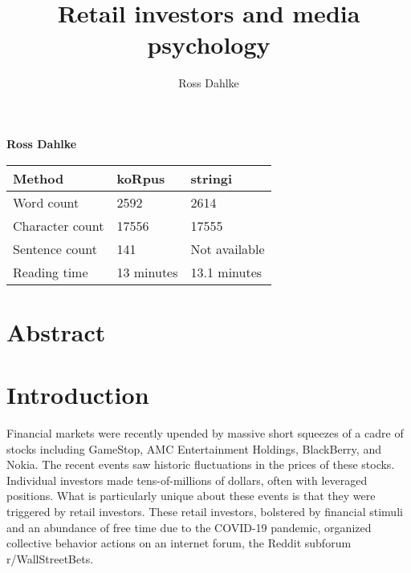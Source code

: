 \documentclass[12pt,]{article}
\title{Retail investors and media psychology  }
\author{\Large Ross Dahlke\vspace{0.05in} \newline\normalsize\emph{}  }
\date{}
\newcommand*{\authorfont}{\fontfamily{phv}\selectfont}
\begin{document}
	
%

{%
\setlength{\parindent}{0pt}
\thispagestyle{plain}
{\fontsize{18}{20}\selectfont\raggedright 
\maketitle  %

}

{
   \vskip 13.5pt\relax \normalsize\fontsize{11}{12} 
\textbf{\authorfont Ross Dahlke} \hskip 15pt \emph{\small }   

}

}






\vskip -8.5pt



\noindent \doublespacing 

\begin{longtable}[]{@{}lll@{}}
\toprule
Method & koRpus & stringi\tabularnewline
\midrule
\endhead
Word count & 2592 & 2614\tabularnewline
Character count & 17556 & 17555\tabularnewline
Sentence count & 141 & Not available\tabularnewline
Reading time & 13 minutes & 13.1 minutes\tabularnewline
\bottomrule
\end{longtable}

\hypertarget{abstract}{%
\section{Abstract}\label{abstract}}

\hypertarget{introduction}{%
\section{Introduction}\label{introduction}}

Financial markets were recently upended by massive short squeezes of a
cadre of stocks including GameStop, AMC Entertainment Holdings,
BlackBerry, and Nokia. The recent events saw historic fluctuations in
the prices of these stocks. Individual investors made tens-of-millions
of dollars, often with leveraged positions. What is particularly unique
about these events is that they were triggered by retail investors.
These retail investors, bolstered by financial stimuli and an abundance
of free time due to the COVID-19 pandemic, organized collective behavior
actions on an internet forum, the Reddit subforum r/WallStreetBets.
\end{document}

